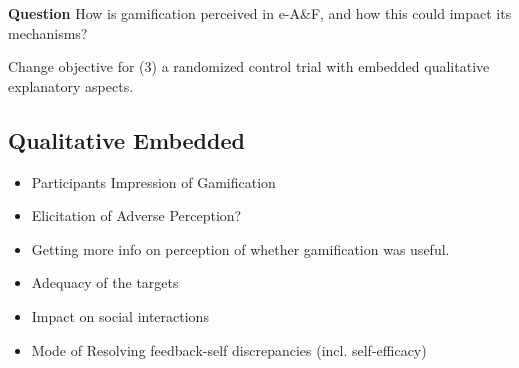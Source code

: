 
\textbf{Question}
How is gamification perceived in e-A\&F, and how this could impact its mechanisms?

Change objective for
 (3) a randomized control trial with embedded qualitative explanatory aspects.
 
\subsection{Qualitative Embedded}

\begin{itemize}
    \item Participants Impression of Gamification
    \item Elicitation of Adverse Perception?
    \item Getting more info on perception of whether gamification was useful.
    \item Adequacy of the targets
    \item Impact on social interactions
    \item Mode of Resolving feedback-self discrepancies (incl. self-efficacy)
\end{itemize}
